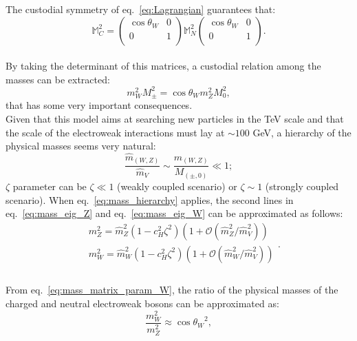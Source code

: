 The custodial symmetry of eq.~\ref{eq:Lagrangian} guarantees that:
\begin{equation}
\mathbb{M}_C^2 =
\begin{pmatrix}
\cos{{\theta}_W} & 0 \\
0 & 1 \\
\end{pmatrix}
\mathbb{M}_N^2
\begin{pmatrix}
\cos{{\theta}_W} & 0 \\
0 & 1 \\
\end{pmatrix}
.
\label{eq:custodial_matrix}
\end{equation}
\\
By taking the determinant of this matrices, a custodial relation among the masses can be extracted:
\begin{equation}
m_W^2 M_{\pm}^2 = \cos{{\theta}_W} m_Z^2 M_0^2,
\label{eq:custodial_relation}
\end{equation}
that has some very important consequences.\\
Given that this model aims at searching new particles in the TeV scale and that the scale of the electroweak interactions must lay at $\sim 100$ GeV,  a hierarchy of the physical masses seems very natural:
\begin{equation}
\frac{\hat{m}_{(W,Z)}}{\hat{m}_V} \sim \frac{{m}_{(W,Z)}}{M_{(\pm, 0)}} \ll 1
;
\label{eq:mass_hierarchy}
\end{equation}
$\zeta$ parameter can be $\zeta \ll 1$ (weakly coupled scenario) or $\zeta \sim 1$ (strongly coupled scenario). When eq.~\ref{eq:mass_hierarchy} applies, the second lines in eq.~\ref{eq:mass_eig_Z} and eq.~\ref{eq:mass_eig_W} can be approximated as follows:
\begin{equation}
\begin{split}
& m_Z^2 = \hat{m}_Z^2 \left( 1 - c_H^2 {\zeta}^2\right) \left( 1 + \mathcal{O}(\hat{m}_Z^2/\hat{m}_V^2) \right) \\
& m_W^2 = \hat{m}_W^2 \left( 1 - c_H^2 {\zeta}^2\right) \left( 1 + \mathcal{O}(\hat{m}_W^2/\hat{m}_V^2) \right) \\
\end{split}
.
\label{eq:mass_simpl}
\end{equation}
\\
From eq.~\ref{eq:mass_matrix_param_W}, the ratio of the physical masses of the charged and neutral electroweak bosons can be approximated as:
\begin{equation}
\frac{m_W^2}{m_Z^2} \approx {\cos{{\theta}_W}}^2,
\label{eq:mass_ewk_ratio}
\end{equation}
